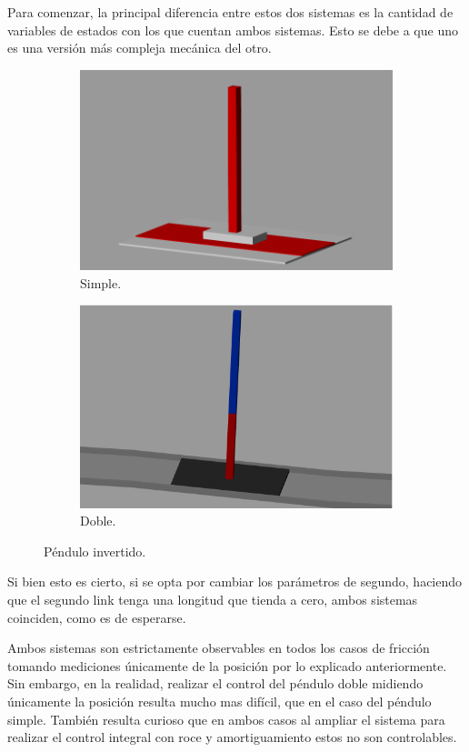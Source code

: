 
Para comenzar, la principal diferencia entre estos dos sistemas es la cantidad de variables de estados con los que cuentan ambos sistemas.
Esto se debe a que uno es una versión más compleja mecánica del otro.
\begin{figure}[H]
\begin{subfigure}{.5\textwidth}
  \centering
  \includegraphics[width=0.95\linewidth]{../Analisis de Resultados/ImagenesAnalisis de Resultados/equilibrio.png}
  \caption{Simple.}
  \label{fig:sfig1}
\end{subfigure}%
\begin{subfigure}{.5\textwidth}
  \centering
  \includegraphics[width=0.95\linewidth]{../Analisis de Resultados/ImagenesAnalisis de Resultados/simscape_double_pendulum.png}
  \caption{Doble.}
  \label{fig:sfig2}
\end{subfigure}
\caption{Péndulo invertido.}
\label{fig:fig}
\end{figure}
Si bien esto es cierto, si se opta por cambiar los parámetros de segundo, haciendo que el segundo link tenga una longitud que tienda a cero, ambos sistemas coinciden, como es de esperarse.

Ambos sistemas son estrictamente observables en todos los casos de fricción tomando mediciones únicamente de la posición por lo explicado anteriormente. Sin embargo, en la realidad, realizar el control del péndulo doble midiendo únicamente la posición resulta mucho mas difícil, que en el caso del péndulo simple.
También resulta curioso que en ambos casos al ampliar el sistema para realizar el control integral con roce y amortiguamiento estos no son controlables.
%